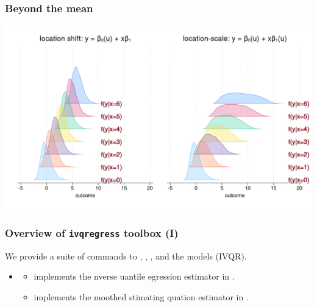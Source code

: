 \documentclass[11pt]{beamer}
\begin{document}
\begin{frame}
  \frametitle{Beyond the mean}
  \begin{center}
	\includegraphics[scale=0.2]{eps/beyondm}
  \end{center}
\end{frame}

\begin{frame}
  \frametitle{Overview of {\tt ivqregress} toolbox (I) } 
  We provide a suite of commands to , ,
  , and  the  models (IVQR).

  \vskip 1cm

  \begin{itemize}

    \setlength\itemsep{1.5em}

    \item {}

      \begin{itemize}
    
	\setlength\itemsep{1.5em}

	\item {} implements the nverse
	  uantile egression estimator in
	  \cite{chernozhukov2006}.

	\item {} implements the moothed
	  stimating quation estimator in \cite{kaplan2017}.
      \end{itemize}

  \end{itemize}
\end{frame}
\end{document}

